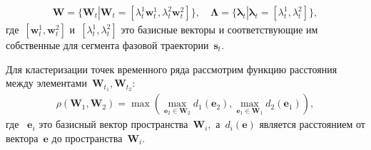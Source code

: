 \begin{equation}
\label{eq:cl:3}
\begin{aligned}
\mathbf{W} = \{\textbf{W}_t| \textbf{W}_t = [\lambda^1_t\textbf{w}^1_t, \lambda^2_t\textbf{w}^2_t]\}, \quad \bm{\Lambda} = \{\bm{\lambda}_t| \bm{\lambda}_t=[\lambda^1_t, \lambda^2_t]\},
\end{aligned}
\end{equation}
где~$[\textbf{w}^1_t, \textbf{w}^2_t]$ и~$[\lambda^1_t, \lambda^2_t]$ это базисные векторы и соответствующие им собственные для сегмента фазовой траектории~$\textbf{s}_t$.

Для кластеризации точек временного ряда рассмотрим функцию расстояния между элементами~$\mathbf{W}_{t_1},\mathbf{W}_{t_2}$:
\begin{equation}
\label{eq:cl:4}
\begin{aligned}
\rho\left(\textbf{W}_1, \textbf{W}_2\right) = \max\left(\max_{\textbf{e}_2 \in \textbf{W}_2} d_{1}\left(\textbf{e}_2\right), \max_{\textbf{e}_1 \in \textbf{W}_1} d_{2}\left(\textbf{e}_1\right)\right),
\end{aligned}
\end{equation}
где ~$\textbf{e}_i$ это базисный вектор пространства~$\textbf{W}_i,$ а~$d_i\left(\textbf{e}\right)$ является расстоянием от вектора~$\textbf{e}$ до пространства~$\textbf{W}_i$.

